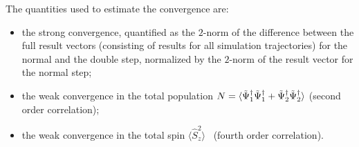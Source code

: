 The quantities used to estimate the convergence are:
\begin{itemize}
\item the strong convergence, quantified as the $2$-norm of the difference between the full result vectors (consisting of results for all simulation trajectories) for the normal and the double step, normalized by the $2$-norm of the result vector for the normal step;
\item the weak convergence in the total population $N = \langle \tilde{\Psi}_1^\dagger \tilde{\Psi}_1^\dagger + \tilde{\Psi}_2^\dagger \tilde{\Psi}_2^\dagger \rangle$ (second order correlation);
\item the weak convergence in the total spin $\langle \hat{S}^2_z \rangle$~ (fourth order correlation).
\end{itemize}

